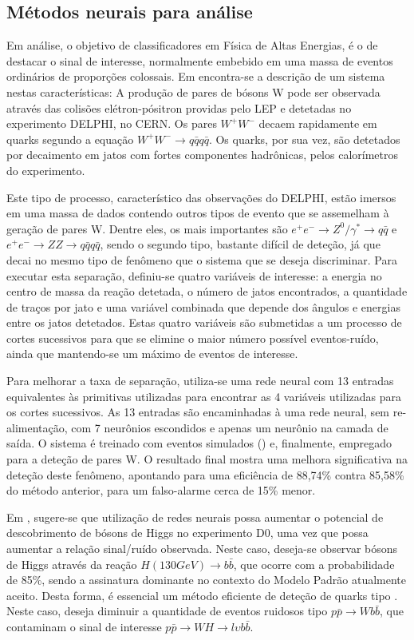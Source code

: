 \subsection{Métodos neurais para análise }

Em análise, o objetivo de classificadores em Física de Altas Energias, é o de
destacar o sinal de interesse, normalmente embebido em uma massa de eventos
ordinários de proporções colossais. Em \cite{becks-acat-2001} encontra-se a
descrição de um sistema nestas características: A produção de pares de bósons
W pode ser observada através das colisões elétron-pósitron providas pelo LEP e
detetadas no experimento DELPHI, no CERN. Os pares $W^+W^-$ decaem rapidamente
em quarks segundo a equação $W^+W^- \rightarrow q\bar{q}q\bar{q}$. Os quarks,
por sua vez, são detetados por decaimento em jatos com fortes componentes
hadrônicas, pelos calorímetros do experimento.

Este tipo de processo, característico das observações do DELPHI, estão imersos
em uma massa de dados contendo outros tipos de evento que se assemelham à
geração de pares W. Dentre eles, os mais importantes são $e^+e^- \rightarrow
Z^0/\gamma^{*} \rightarrow q\bar{q}$ e $e^+e^- \rightarrow ZZ \rightarrow
q\bar{q}q\bar{q}$, sendo o segundo tipo, bastante difícil de deteção, já que
decai no mesmo tipo de fenômeno que o sistema que se deseja discriminar. Para
executar esta separação, definiu-se quatro variáveis de interesse: a energia
no centro de massa da reação detetada, o número de jatos encontrados, a
quantidade de traços por jato e uma variável combinada que depende dos ângulos
e energias entre os jatos detetados. Estas quatro variáveis são submetidas a
um processo de cortes sucessivos para que se elimine o maior número possível
eventos-ruído, ainda que mantendo-se um máximo de eventos de interesse.

Para melhorar a taxa de separação, utiliza-se uma rede neural com 13 entradas
equivalentes às primitivas utilizadas para encontrar as 4 variáveis utilizadas
para os cortes sucessivos. As 13 entradas são encaminhadas à uma rede neural,
sem re-alimentação, com 7 neurônios escondidos e apenas um neurônio na camada
de saída. O sistema é treinado com eventos simulados () e,
finalmente, empregado para a deteção de pares W. O resultado final mostra uma
melhora significativa na deteção deste fenômeno, apontando para uma eficiência
de 88,74\% contra 85,58\% do método anterior, para um falso-alarme cerca de
15\% menor.

Em \cite{tentindo-acat-2001}, sugere-se que utilização de redes neurais possa
aumentar o potencial de descobrimento de bósons de Higgs no experimento D0,
uma vez que possa aumentar a relação sinal/ruído observada. Neste caso,
deseja-se observar bósons de Higgs através da reação $H(130 GeV) \rightarrow
b\bar{b}$, que ocorre com a probabilidade de 85\%, sendo a assinatura
dominante no contexto do Modelo Padrão atualmente aceito. Desta forma, é
essencial um método eficiente de deteção de quarks tipo . Neste
caso, deseja diminuir a quantidade de eventos ruidosos tipo $p\bar{p}
\rightarrow Wb\bar{b}$, que contaminam o sinal de interesse $p\bar{p}
\rightarrow WH \rightarrow l \upsilon b\bar{b}$. 

